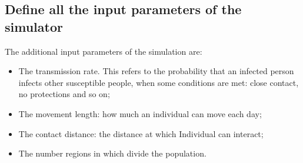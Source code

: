 \documentclass[twocolumn,letterpaper]{report}
\begin{document}
{			\subsection{Define all the input parameters of the simulator}
					The additional input parameters of the simulation are:
					\begin{itemize}
						\item The transmission rate. This refers to the probability that an infected person infects other susceptible people, when some conditions are met: close contact, no protections and so on;
						\item The movement length: how much an individual can move each day;
						\item The contact distance: the distance at which Individual can interact;
						\item The number regions in which divide the population.
					\end{itemize}
					
}
\end{document}

